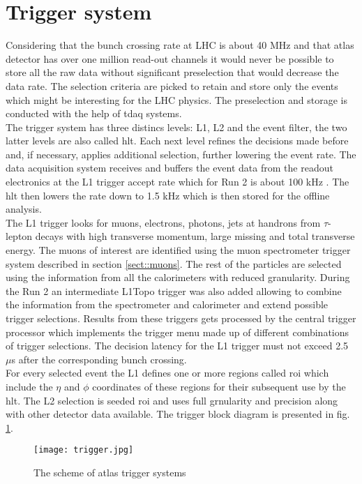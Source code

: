 \section{Trigger system}
\label{sect::trigger}
 Considering that the bunch crossing rate at LHC is about 40 MHz and that \gls{atlas} detector has over one million read-out channels it would never be possible to store all the raw data without significant preselection that would decrease the data rate. The selection criteria are picked to retain and store only the events which might be interesting for the LHC physics. The preselection and storage is conducted with the help of \gls{tdaq} systems. \\
 The trigger system has three distincs levels: L1, L2 and the event filter,  the two latter levels are also called \gls{hlt}. Each next level refines the decisions made before and, if necessary, applies additional selection, further lowering the event rate. The data acquisition system receives and buffers the event data from the readout electronics at the L1 trigger accept rate which for Run 2 is about 100 kHz \cite{daq}. The \gls{hlt} then lowers the rate down to 1.5 kHz which is then stored for the offline analysis. \\
 The L1 trigger looks for muons, electrons, photons, jets at handrons from $\tau$-lepton decays with high transverse momentum, large missing and total transverse energy. The muons of interest are identified using the muon spectrometer trigger system described in section \ref{sect::muons}. The rest of the particles are selected using the information from all the calorimeters with reduced granularity.  During the Run 2 an intermediate L1Topo trigger was also added allowing to combine the information from the spectrometer and calorimeter and extend possible trigger selections. Results from these triggers gets processed by the central trigger processor which implements the trigger menu made up of different combinations of trigger selections. The decision latency for the L1 trigger must not exceed 2.5 $\mu$s after the corresponding bunch crossing. \\
 For every selected event the L1 defines one or more regions called \gls{roi} which include the $\eta$ and $\phi$ coordinates of these regions for their subsequent use by the \gls{hlt}. The L2 selection is seeded \gls{roi} and uses full grnularity and precision along with other detector data available. The trigger block diagram is presented in fig. \ref{fig::trigger}.
    \begin{figure}[htpb]
	\texttt{[image: trigger.jpg]}
	\caption{ The scheme of \gls{atlas} trigger systems}
	\label{fig::trigger}
\end{figure}